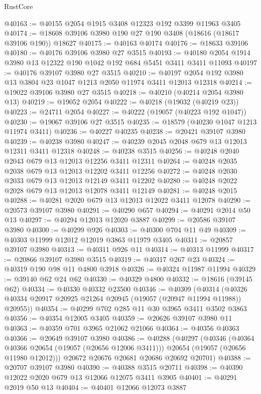 \begin{lexlean}{RustCore}
\begin{coremodule}
@40163 := @40155 @2054 @1915 @3408 @12323 @192 @3399 @11963 @3405
@40174 := @18608 @39106 @3980 @190 @27 @190 @3408 (@18616 (@18617 @39106 @190)) @18627
@40175 := @40163 @40174
@40176 := @18633 @39106
@40180 := @40176 @39106 @3980 @27 @3515
@40193 := @40180 @2054 @1914 @3980 @13 @12322 @190 @1042 @192 @684 @5451 @3411 @3411 @11093
@40197 := @40176 @39107 @3980 @27 @3515
@40210 := @40197 @2054 @192 @3980 @13 @3804 @23 @1047 @1213 @2050 @11974 @3411 @12013 @12318
@40214 := @19022 @39106 @3980 @27 @3515
@40218 := @40210 (@40214 @2054 @3980 @13)
@40219 := @19052 @2054
@40222 := @40218 (@19032 (@40219 @23))
@40223 := @24711 @2054
@40227 := @40222 (@19057 (@40223 @192 @1047))
@40230 := @19067 @39106 @27 @3515
@40235 := @18579 (@40230 @1047 @1213 @11974 @3411)
@40236 := @40227 @40235
@40238 := @20421 @39107 @3980
@40239 := @40238 @3980
@40247 := @40239 @2045 @2048 @679 @13 @12013 @12311 @3411 @12318
@40248 := @40238 @3515
@40256 := @40248 @2040 @2043 @679 @13 @12013 @12256 @3411 @12311
@40264 := @40248 @2035 @2038 @679 @13 @12013 @12202 @3411 @12256
@40272 := @40248 @2030 @2033 @679 @13 @12013 @12149 @3411 @12202
@40280 := @40248 @2022 @2028 @679 @13 @12013 @12078 @3411 @12149
@40281 := @40248 @2015
@40288 := @40281 @2020 @679 @13 @12013 @12022 @3411 @12078
@40290 := @20573 @39107 @3980
@40291 := @40290 @657
@40294 := @40291 @2014 @50 @13
@40297 := @40294 @12013 @12020 @3887
@40299 := @20586 @39107 @3980
@40300 := @40299 @926
@40303 := @40300 @704 @11 @49
@40309 := @40303 @11999 @12012 @12019 @3863 @11979 @3405
@40311 := @20857 @39107 @3980
@40313 := @40311 @926 @11
@40314 := @40313 @11999
@40317 := @20866 @39107 @3980 @3515
@40319 := @40317 @267 @23
@40324 := @40319 @190 @98 @11 @4800 @3918
@40326 := @40324 @11987 @11994
@40329 := @39140 @62 @24 @62
@40330 := @40329 @4800
@40332 := @18616 (@39145 @62)
@40334 := @40330 @40332 @23500
@40346 := @40309
    (@40314 (@40326 @40334 @20917 @20925 @21264 @20945 (@19057 (@20947 @11994 @11988)) @20955))
@40354 := @40299 @702 @285 @11 @30 @3965 @3411 @3502 @3863
@40356 := @40354 @12005 @3405
@40359 := @20626 @39107 @3980 @11
@40363 := @40359 @701 @3965 @21062 @21066
@40364 := @40356 @40363
@40366 := @20649 @39107 @3980
@40386 := @40288
    (@40297
      (@40346
        (@40364 @40366 @20654 (@19057 (@20656 @12006 @3411)))
        @20654
        (@19057 (@20656 @11980 @12012)))
      @20672
      @20676
      @20681
      @20686
      @20692
      @20701)
@40388 := @20707 @39107 @3980
@40390 := @40388 @3515 @20711
@40398 := @40390 @12022 @2020 @679 @13 @12066 @12075 @3411 @3905
@40401 := @40291 @2019 @50 @13
@40404 := @40401 @12066 @12073 @3887

\end{coremodule}
\end{lexlean}
